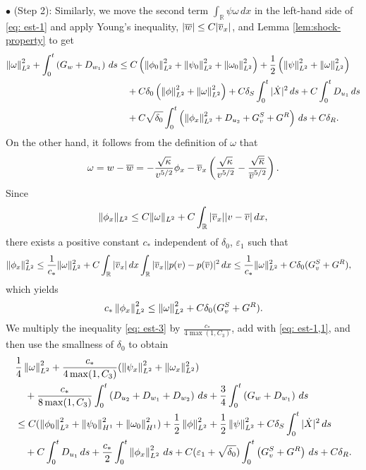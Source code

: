 \documentclass[11pt,reqno]{amsart}
\begin{document}
\noindent $\bullet$ (Step 2): Similarly, we move the second term $\int_\mathbb{R} \psi \omega \, dx$ in the left-hand side of \eqref{eq: est-1} and apply Young's inequality, $|\overline{w}| \le C |\overline{v}_x|$, and Lemma \ref{lem:shock-property} to get
\begin{equation} \label{eq: est-1,1}
\begin{aligned}
	\left\lVert\omega\right\rVert_{L^2}^2+  \int_0^t \left( G_w + D_{w_1} \right) \, d s &\le C\left(\left\lVert\phi_0\right\rVert_{L^2}^2 + \left\lVert\psi_0\right\rVert_{L^2}^2+\left\lVert\omega_0\right\rVert_{L^2}^2\right)+ \frac{1}{2} \left( \left\lVert \psi\right\rVert_{L^2}^2 + \left\lVert\omega\right\rVert_{L^2}^2 \right) \\
	&\quad + C \delta_0 \left( \left\lVert \phi\right\rVert_{L^2}^2 + \left\lVert\omega\right\rVert_{L^2}^2 \right) + C \delta_S \int_0^t | \dot{X}|^2 \, ds+ C \int_0^t D_{u_1} \, d s \\
	&\quad +C \sqrt{\delta_0} \int_0^t \left( \left\lVert\phi_x\right\rVert_{L^2}^2 +D_{u_2}+ G^S_v + G^R \right) \, d s + C \delta_R .
\end{aligned}
\end{equation}
On the other hand, it follows from the definition of $\omega$ that 
\begin{align*}
\omega = w-\overline{w}=-\frac{\sqrt{\kappa}}{v^{5/2}} \phi_x -\overline{v}_x\left(\frac{\sqrt{\kappa}}{v^{5/2}}-\frac{\sqrt{\overline{\kappa}}}{\overline{v}^{5/2}}\right).
\end{align*}
Since
\[\|\phi_x\|_{L^2}\le C\|\omega\|_{L^2}+C\int_{\mathbb{R}} |\overline{v}_x||v-\overline{v}|\,dx,\]
there exists a positive constant $c_*$ independent of $\delta_0$, $\varepsilon_1$ such that
\begin{align*}
\|\phi_x\|_{L^2}^2&\le \frac{1}{c_*}\|\omega\|_{L^2}^2+C\int_{\mathbb{R}} |\overline{v}_x|\,dx\int_{\mathbb{R}}|\overline{v}_x||p(v)-p(\overline{v})|^2\,dx\le \frac{1}{c_*}\|\omega\|_{L^2}^2+C\delta_0(G^S_v +G^R),
\end{align*}
which yields
\begin{equation} \label{eq: omega 2-norm inequality}
\begin{aligned}
	c_* \left\lVert\phi_x\right\rVert_{L^2}^2\le \left\lVert\omega\right\rVert_{L^2}^2 + C\delta_0(G^S_v +G^R).
\end{aligned}
\end{equation}
We multiply the inequality \eqref{eq: est-3} by $\frac{c_*}{4 \max(1,C_3)}$, add with \eqref{eq: est-1,1}, and then use the smallness of $\delta_0$ to obtain
\begin{equation*}
\begin{aligned}
&\frac{1}{4}\left\lVert\omega\right\rVert_{L^2}^2+\frac{c_*}{4 \max(1,C_3)} (\left\lVert\psi_x\right\rVert_{L^2}^2+\|\omega_x\|_{L^2}^2) \\
&\quad +\frac{c_*}{8 \max(1,C_3)} \int_0^t \left( D_{u_2} + D_{w_1} + D_{w_2} \right) \, d s+ \frac{3}{4} \int_0^t \left( G_w + D_{w_1} \right) \, d s \\ 
&\le C (\left\lVert\phi_0\right\rVert_{L^2}^2+\left\lVert\psi_0\right\rVert_{H^1}^2+\left\lVert\omega_0\right\rVert_{H^1}^2) + \frac{1}{2} \left\lVert\phi\right\rVert_{L^2}^2+\frac12 \left\lVert\psi\right\rVert_{L^2}^2 + C \delta_S \int_0^t | \dot{X}|^2 \, ds \\
&\quad + C \int_0^t D_{u_1} \, d s + \frac{c_*}{2} \int_0^t \left\lVert\phi_x\right\rVert_{L^2}^2 \, d s  +C (\varepsilon_1 + \sqrt{\delta_0} )\int_0^t \left( G^S_v + G^R \right) \, d s +C \delta_R.
\end{aligned}
\end{equation*}
\end{document}
